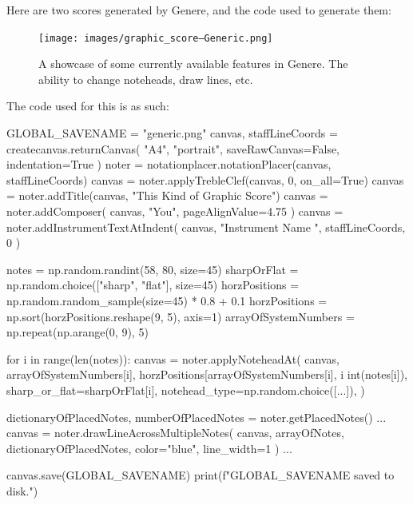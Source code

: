 \documentclass{article}
\begin{document}
Here are two scores generated by Genere, and the code used to generate them:
\begin{figure}[h]
	\centering
	\texttt{[image: images/graphic\_score--Generic.png]}
	\caption{A showcase of some currently available features in Genere. The ability to change noteheads, draw lines, etc.}
\end{figure}
\newpage
The code used for this is as such:
\begin{ffcode}
	GLOBAL_SAVENAME = "generic.png"
	canvas, staffLineCoords = createcanvas.returnCanvas(
	"A4", "portrait", saveRawCanvas=False, indentation=True
	)
	noter = notationplacer.notationPlacer(canvas, staffLineCoords)
	canvas = noter.applyTrebleClef(canvas, 0, on_all=True)
	canvas = noter.addTitle(canvas, "This Kind of Graphic Score")
	canvas = noter.addComposer(
	canvas, "You", pageAlignValue=4.75
	)
	canvas = noter.addInstrumentTextAtIndent(
	canvas, "Instrument Name   ", staffLineCoords, 0
	)

	notes = np.random.randint(58, 80, size=45)
	sharpOrFlat = np.random.choice(["sharp", "flat"], size=45)
	horzPositions = np.random.random_sample(size=45) * 0.8 + 0.1
	horzPositions = np.sort(horzPositions.reshape(9, 5), axis=1)
	arrayOfSystemNumbers = np.repeat(np.arange(0, 9), 5)


	for i in range(len(notes)):
	canvas = noter.applyNoteheadAt(
	canvas,
	arrayOfSystemNumbers[i],
	horzPositions[arrayOfSystemNumbers[i], i %
	int(notes[i]),
	sharp_or_flat=sharpOrFlat[i],
	notehead_type=np.random.choice([...]),
	)

	dictionaryOfPlacedNotes, numberOfPlacedNotes = noter.getPlacedNotes()
	...
	canvas = noter.drawLineAcrossMultipleNotes(
	canvas, arrayOfNotes, dictionaryOfPlacedNotes, color="blue", line_width=1
	)
	...

	canvas.save(GLOBAL_SAVENAME)
	print(f"{GLOBAL_SAVENAME} saved to disk.")
\end{ffcode}
\end{document}

